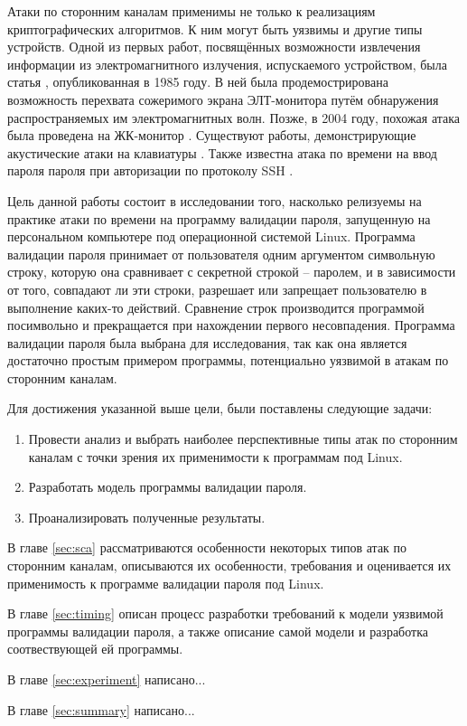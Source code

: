 Атаки по сторонним каналам применимы не только к реализациям криптографических
алгоритмов. К ним могут быть уязвимы и другие типы устройств. Одной из первых
работ, посвящённых возможности извлечения информации из электромагнитного
излучения, испускаемого устройством, была статья \cite{van-eck}, опубликованная
в 1985 году. В ней была продемострирована возможность перехвата сожеримого
экрана ЭЛТ-монитора путём обнаружения распространяемых им электромагнитных волн.
Позже, в 2004 году, похожая атака была проведена на ЖК-монитор \cite{kuhn}.
Существуют работы, демонстрирующие акустические атаки на клавиатуры
\cite{asonov} \cite{zhuang}. Также известна атака по времени на ввод пароля пароля
при авторизации по протоколу SSH \cite{ssh}.

Цель данной работы состоит в исследовании того, насколько релизуемы на практике
атаки по времени на программу валидации пароля, запущенную на персональном
компьютере под операционной системой Linux. Программа валидации пароля
принимает от пользователя одним аргументом символьную строку, которую она
сравнивает с секретной строкой -- паролем, и в зависимости от того, совпадают
ли эти строки, разрешает или запрещает пользователю в выполнение каких-то
действий. Сравнение строк производится программой посимвольно и прекращается
при нахождении первого несовпадения. Программа валидации пароля была выбрана
для исследования, так как она является достаточно простым примером программы,
потенциально уязвимой в атакам по сторонним каналам.

Для достижения указанной выше цели, были поставлены следующие задачи:
\begin{enumerate}
\item Провести анализ и выбрать наиболее перспективные типы атак по сторонним
  каналам с точки зрения их применимости к программам под Linux.
\item Разработать модель программы валидации пароля.
\item Проанализировать полученные результаты.
\end{enumerate}

В главе \ref{sec:sca} рассматриваются особенности некоторых типов атак по
сторонним каналам, описываются их особенности, требования и оценивается
их применимость к программе валидации пароля под Linux.

В главе \ref{sec:timing} описан процесс разработки требований к модели уязвимой
программы валидации пароля, а также описание самой модели и разработка
соотвествующей ей программы.

В главе \ref{sec:experiment} написано...

В главе \ref{sec:summary} написано...

\clearpage
